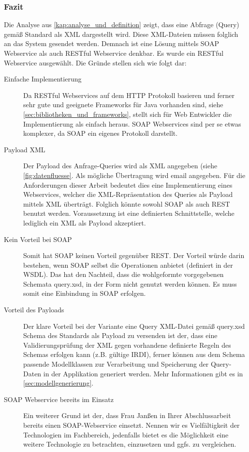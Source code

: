 \subsubsection{Fazit}
Die Analyse aus \autoref{kap:analyse_und_definition} zeigt, dass eine Abfrage (Query) gemäß Standard als XML dargestellt wird. Diese XML-Dateien müssen folglich an das System gesendet werden. Demnach ist eine Lösung mittels \gls{SOAP} \gls{Webservice} als auch \gls{REST}ful \gls{Webservice} denkbar. 
Es wurde ein \gls{REST}ful \gls{Webservice} ausgewählt. Die Gründe stellen sich wie folgt dar:

\begin{description}
\item[Einfache Implementierung] Da \gls{REST}ful Webservices auf dem \gls{HTTP} Protokoll basieren und ferner sehr gute und geeignete Frameworks für Java vorhanden sind, siehe \autoref{sec:bibliotheken_und_frameworks}, stellt sich für Web Entwickler die Implementierung als einfach heraus. \gls{SOAP} \glspl{Webservice} sind per se etwas komplexer, da \gls{SOAP} ein eigenes Protokoll darstellt. 
\item[Payload XML] Der Payload des Anfrage-Queries wird als XML angegeben (siehe \autoref{fig:datenfluesse}. Als mögliche Übertragung wird email angegeben. Für die Anforderungen dieser Arbeit bedeutet dies eine Implementierung eines \glspl{Webservice}, welcher die XML-Repräsentation des Queries als Payload mittels XML überträgt. Folglich könnte sowohl \gls{SOAP} als auch \gls{REST} benutzt werden. Voraussetzung ist eine definierten Schnittstelle, welche lediglich ein XML als Payload akzeptiert. 
\item[Kein Vorteil bei SOAP] Somit hat \gls{SOAP} keinen Vorteil gegenüber \gls{REST}. Der Vorteil würde darin bestehen, wenn \gls{SOAP} selbst die Operationen anbietet (definiert in der \gls{WSDL}). Das hat den Nachteil, dass die wohlgeformte vorgegebenen Schemata query.xsd, in der Form nicht genutzt werden können. Es muss somit eine Einbindung in \gls{SOAP} erfolgen.
 \item[Vorteil des Payloads] Der klare Vorteil bei der Variante eine Query XML-Datei gemäß query.xsd Schema des Standards als Payload zu versenden ist der, dass eine Validierungsprüfung der XML gegen vorhandene definierte Regeln des Schemas erfolgen kann (z.B. gültige \gls{IRDI}), ferner können aus dem Schema passende Modellklassen zur Verarbeitung und Speicherung der Query-Daten in der Applikation generiert werden. Mehr Informationen gibt es in \autoref{sec:modellgenerierung}. 
\item[SOAP Webservice bereits im Einsatz] Ein weiterer Grund ist der, dass Frau Janßen in Ihrer Abschlussarbeit bereits einen SOAP-Webservice einsetzt. Nennen wir es Vielfältigkeit der Technologien im Fachbereich, jedenfalls bietet es die Möglichkeit eine weitere Technologie zu betrachten, einzusetzen und ggfs. zu vergleichen. 
\end{description}

